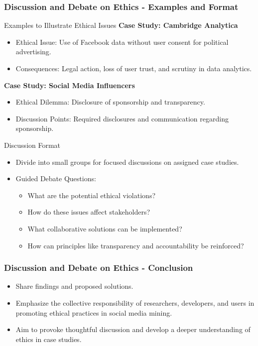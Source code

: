 \documentclass{beamer}
\begin{document}
\begin{frame}[fragile]
    \frametitle{Discussion and Debate on Ethics - Examples and Format}
    \begin{block}{Examples to Illustrate Ethical Issues}
        \textbf{Case Study: Cambridge Analytica}
        \begin{itemize}
            \item Ethical Issue: Use of Facebook data without user consent for political advertising.
            \item Consequences: Legal action, loss of user trust, and scrutiny in data analytics.
        \end{itemize}

        \textbf{Case Study: Social Media Influencers}
        \begin{itemize}
            \item Ethical Dilemma: Disclosure of sponsorship and transparency.
            \item Discussion Points: Required disclosures and communication regarding sponsorship.
        \end{itemize}
    \end{block}

    \begin{block}{Discussion Format}
        \begin{itemize}
            \item Divide into small groups for focused discussions on assigned case studies.
            \item Guided Debate Questions:
            \begin{itemize}
                \item What are the potential ethical violations?
                \item How do these issues affect stakeholders?
                \item What collaborative solutions can be implemented?
                \item How can principles like transparency and accountability be reinforced?
            \end{itemize}
        \end{itemize}
    \end{block}
\end{frame}

\begin{frame}[fragile]
    \frametitle{Discussion and Debate on Ethics - Conclusion}
    \begin{itemize}
        \item Share findings and proposed solutions.
        \item Emphasize the collective responsibility of researchers, developers, and users in promoting ethical practices in social media mining.
        \item Aim to provoke thoughtful discussion and develop a deeper understanding of ethics in case studies.
    \end{itemize}
\end{frame}
\end{document}
